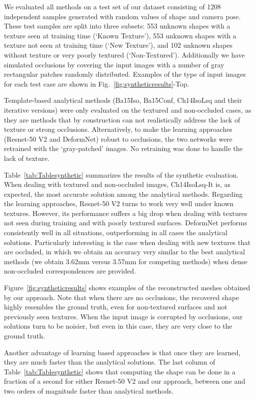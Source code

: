 \documentclass[10pt,twocolumn,letterpaper]{article}
\begin{document}
 We evaluated all methods on a test set of our dataset consisting of 1208 independent samples generated with random values of   shape and camera pose. These test samples are split into three subsets: 553 unknown shapes with a texture seen at training time (`Known Texture'), 553 unknown shapes with a texture not seen at training time (`New Texture'), and 102 unknown shapes without texture or very poorly textured (`Non-Textured'). Additionally we have simulated occlusions by covering the input images with a number of gray rectangular patches randomly distributed. Examples of the type of input images for each test case are shown in Fig.~\ref{fig:syntheticresults}-Top.

Template-based analytical methods  (Ba15Iso, Ba15Conf, Ch14IsoLsq and their iterative versions) were only evaluated on the textured and non-occluded cases, as they are methods that by construction can not realistically address the lack of texture or strong occlusions.   Alternatively, to make the learning approaches (Resnet-50 V2 and  DeformNet) robust to occlusions, the two networks were retrained with the `gray-patched' images. No retraining was done to handle the lack of texture. 
 
Table~\ref{tab:Tablesynthetic} summarizes the results of the synthetic evaluation. When dealing with textured and non-occluded images, Ch14IsoLsq-It is, as expected, the most accurate solution among the analytical methods. Regarding the learning approaches, Resnet-50 V2 turns to work very well under known textures. However, its performance suffers a big drop when dealing with textures not seen during training and with poorly textured surfaces.   DeformNet performs consistently well in all situations, outperforming in all cases the analytical solutions. Particularly interesting is the case when dealing with new textures that are occluded, in which we obtain an accuracy very similar to the best analytical methods (we obtain 3.62mm versus 3.57mm for competing methods) when dense non-occluded correspondences are provided.

Figure~\ref{fig:syntheticresults} shows examples of the reconstructed meshes obtained by our approach. Note that when there are no occlusions, the recovered shape highly resembles the ground truth, even for non-textured surfaces and not previously seen textures. When the input image is corrupted by occlusions, our solutions turn to be noisier, but even in this case, they are very close to the ground truth.
 
\vspace{1mm}
Another advantage of  learning based approaches is that once they are learned, they are much faster than the analytical solutions. The last column of Table~\ref{tab:Tablesynthetic} shows that computing the shape can be done in a fraction of a second for either Resnet-50 V2 and our approach, between one and two orders of magnitude faster than analytical methods. 
\end{document}
